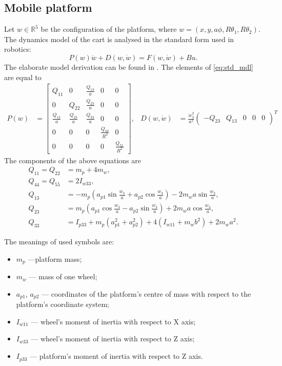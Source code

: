 \subsection{Mobile platform}
Let $w\in \mathbb{R}^5$ be the configuration of the platform, where
$w=(x, y, a\phi, R\theta_1, R\theta_2)$.  
The dynamics model of the cart is analysed in the standard form used in robotics:
\begin{equation}
\label{eq:std_mdl}
P(w)\ddot w + D(w, \dot w) = F(w, \dot w) + Bu.
\end{equation}
The elaborate model derivation can be found in \cite{coupled}. 
The elements of \eqref{eq:std_mdl} are equal to
\begin{align}
P(w) &= \begin{bmatrix}
Q_{11} & 0 & \frac{Q_{13}}{a} & 0 & 0\\
0 & Q_{22} & \frac{Q_{23}}{a} & 0 & 0\\
\frac{Q_{13}}{a} & \frac{Q_{23}}{a} & \frac{Q_{33}}{a} & 0 & 0\\
0 & 0 & 0 & \frac{Q_{44}}{R^2} & 0 \\
0 & 0 & 0 & 0 & \frac{Q_{55}}{R^2}
\end{bmatrix}, & 
D(w, \dot w) &= \frac{\dot w_3^2}{a^2}\begin{pmatrix}
-Q_{23} & Q_{13} & 0 & 0 & 0
\end{pmatrix}^T
\end{align}
The components of the above equations are
\begin{align}
Q_{11} = Q_{22} &= m_p+4m_w,\\
Q_{44} = Q_{55} &= 2I_{w33},\\
Q_{13} &= -m_p(a_{p1}\sin\frac{w_3}{a}+a_{p2}\cos\frac{w_3}{a})- 2m_wa\sin\frac{w_3}{a},\\
Q_{23} &=  m_p(a_{p1}\cos\frac{w_3}{a}-a_{p2}\sin\frac{w_3}{a})+ 2m_wa\cos\frac{w_3}{a},\\
Q_{33} &= I_{p33}+m_p(a_{p1}^2+a_{p2}^2)+4(I_{w11}+m_wb^2)+2m_wa^2.
\end{align}

The meanings of used symbols are:
\begin{itemize}
\item $m_p$ ---platform mass;
\item $m_w$ --- mass of one wheel;
\item $a_{p1}$, $a_{p2}$ --- coordinates of the platform's centre of mass with respect to the platform's coordinate system;
\item $I_{w11}$ --- wheel's moment of inertia with respect to X axis;
\item $I_{w33}$ --- wheel's moment of inertia with respect to Z axis;
\item $I_{p33}$ --- platform's moment of inertia with respect to Z axis.

\end{itemize}

